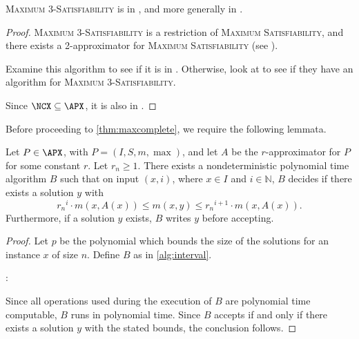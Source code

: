 \documentclass[]{article}
\begin{document}
\begin{theorem}\label{thm:inncx}\label{thm:inapx}
  \textsc{Maximum 3-Satisfiability} is in \NCX, and more generally in \APX.
\end{theorem}
\begin{proof}
  \textsc{Maximum 3-Satisfiability} is a restriction of \textsc{Maximum Satisfiability}, and there exists a \FNC{} 2-approximator for \textsc{Maximum Satisfiability} (see \cite[Program~3.1]{book}).
  \begin{todo}
    Examine this algorithm to see if it is in \NC.
    Otherwise, look at \cite{dsst97} to see if they have an algorithm for \textsc{Maximum 3-Satisfiability}.
  \end{todo}
  Since $\NCX \subseteq \APX$, it is also in \APX.
\end{proof}

Before proceeding to \autoref{thm:maxcomplete}, we require the following lemmata.

\begin{lemma}\label{lem:interval}
  Let $P \in \APX$, with $P = (I, S, m, \max)$, and let $A$ be the $r$-approximator for $P$ for some constant $r$.
  Let $r_n \geq 1$.
  There exists a nondeterministic polynomial time algorithm $B$ such that on input $(x, i)$, where $x \in I$ and $i \in \mathbb{N}$, $B$ decides if there exists a solution $y$ with
  \begin{equation*}
    {r_n}^i \cdot m(x, A(x)) \leq m(x, y) \leq {r_n}^{i + 1} \cdot m(x, A(x)).
  \end{equation*}
  Furthermore, if a solution $y$ exists, $B$ writes $y$ before accepting.
\end{lemma}
\begin{proof}
  Let $p$ be the polynomial which bounds the size of the solutions for an instance $x$ of size $n$.
  Define $B$ as in \autoref{alg:interval}.
  \begin{algorithm}
    \caption{Nondeterministic polynomial time algorithm that decides if there is an approximate solution for instance $x$ of problem $P$ in interval $i$%
      \label{alg:interval}}
    \begin{algorithmic}[1]
      \Statex{}
      :
        \Else
        \EndIf
      \EndFunction
    \end{algorithmic}
  \end{algorithm}
  Since all operations used during the execution of $B$ are polynomial time computable, $B$ runs in polynomial time.
  Since $B$ accepts if and only if there exists a solution $y$ with the stated bounds, the conclusion follows.
\end{proof}
\end{document}
